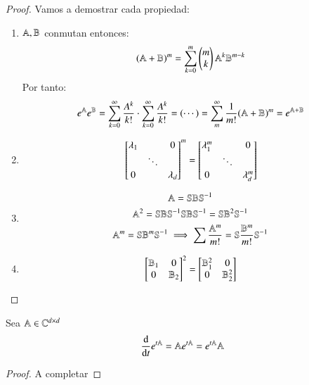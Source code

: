 \begin{proof}
    Vamos a demostrar cada propiedad:\\
    \begin{enumerate}
        \item $\mathbb{A}, \mathbb{B}$ conmutan entonces:
        $$
            (\mathbb{A} + \mathbb{B})^m = \sum_{k=0}^m
            \left(\begin{matrix}
                m\\
                k
            \end{matrix} \right)
            \mathbb{A}^k \mathbb{B}^{m-k}
        $$
        Por tanto:
        $$
            e^{\mathbb{A}} e^{\mathbb{B}} = \sum_{k=0}^{\infty}\frac{A^k}{k!} \cdot  \sum_{k=0}^{\infty}\frac{A^k}{k!} = (\cdots) = \sum_m^{\infty} \frac{1}{m!}(\mathbb{A}+\mathbb{B})^m = e^{\mathbb{A}+\mathbb{B}}
        $$
        \item
        $$
            \left[\begin{matrix}\lambda_1& &0\\
                &\ddots&\\
                0& &\lambda_d\end{matrix}\right]^m =
                \left[\begin{matrix}\lambda_1^m&&0\\
                    &\ddots&\\
                    0&&\lambda_d^m\end{matrix}\right]
        $$
        \item
        \begin{gather*}
                \mathbb{A} = \mathbb{S} \mathbb{B} \mathbb{S}^{-1}\\
                \mathbb{A}^2 = \mathbb{S} \mathbb{B} \mathbb{S}^{-1}\mathbb{S} \mathbb{B} \mathbb{S}^{-1} = \mathbb{S} \mathbb{B}^2 \mathbb{S}^{-1}\\
                \mathbb{A}^m = \mathbb{S} \mathbb{B}^m \mathbb{S}^{-1} \implies \sum \frac{\mathbb{A}^m}{m!} = \mathbb{S} \frac{\mathbb{B}^m}{m!} \mathbb{S}^{-1}
        \end{gather*}
        \item
        $$
            \left[\begin{matrix}\mathbb{B}_1 & 0 \\
                0 & \mathbb{B}_2\end{matrix}\right] ^2 = \left[\begin{matrix}\mathbb{B}_1^2 & 0 \\
                    0 & \mathbb{B}_2^2\end{matrix}\right]
        $$
    \end{enumerate}
\end{proof}

\begin{pro}
    Sea $\mathbb{A} \in \mathbb{C}^{d\times d}$\\
    $$
        \frac{\mathrm{d}}{\mathrm{d}t} e^{t\mathbb{A}} = \mathbb{A} e^{t\mathbb{A}} = e^{t\mathbb{A}} \mathbb{A}
    $$
\end{pro}
\begin{proof}
    A completar
\end{proof}
